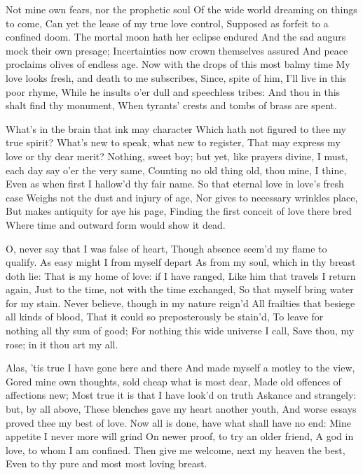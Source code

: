 \documentclass[twocolumn]{book}
\begin{document}
Not mine own fears, nor the prophetic soul
Of the wide world dreaming on things to come,
Can yet the lease of my true love control,
Supposed as forfeit to a confined doom.
\numerus*{}The mortal moon hath her eclipse endured
And the sad augurs mock their own presage;
Incertainties now crown themselves assured
And peace proclaims olives of endless age.
Now with the drops of this most balmy time
My love looks fresh, and death to me subscribes,
Since, spite of him, I'll live in this poor rhyme,
While he insults o'er dull and speechless tribes:
  And thou in this shalt find thy monument,
  When tyrants' crests and tombs of brass are spent.


What's in the brain that ink may character
Which hath not figured to thee my true spirit?
What's new to speak, what new to register,
That may express my love or thy dear merit?
Nothing, sweet boy; but yet, like prayers divine,
I must, each day say o'er the very same,
Counting no old thing old, thou mine, I thine,
Even as when first I hallow'd thy fair name.
So that eternal love in love's fresh case
Weighs not the dust and injury of age,
Nor gives to necessary wrinkles place,
But makes antiquity for aye his page,
  Finding the first conceit of love there bred
  Where time and outward form would show it dead.


O, never say that I was false of heart,
Though absence seem'd my flame to qualify.
As easy might I from myself depart
As from my soul, which in thy breast doth lie:
That is my home of love: if I have ranged,
Like him that travels I return again,
Just to the time, not with the time exchanged,
So that myself bring water for my stain.
Never believe, though in my nature reign'd
All frailties that besiege all kinds of blood,
That it could so preposterously be stain'd,
To leave for nothing all thy sum of good;
  For nothing this wide universe I call,
  Save thou, my rose; in it thou art my all.

Alas, 'tis true I have gone here and there
And made myself a motley to the view,
Gored mine own thoughts, sold cheap what is most dear,
Made old offences of affections new;
Most true it is that I have look'd on truth
Askance and strangely: but, by all above,
These blenches gave my heart another youth,
And worse essays proved thee my best of love.
Now all is done, have what shall have no end:
Mine appetite I never more will grind
On newer proof, to try an older friend,
A god in love, to whom I am confined.
  Then give me welcome, next my heaven the best,
  Even to thy pure and most most loving breast.
\end{document}
